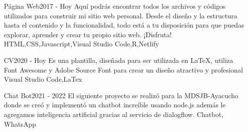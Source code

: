 %
%
%


\begin{projects}

	\project
	{Página Web}{2017 - Hoy}
	{ }
	{Aquí podrás encontrar todos los archivos y códigos utilizados para construir mi sitio web personal. Desde el diseño y la estructura hasta el contenido y la funcionalidad, todo está a tu disposición para que puedas explorar, aprender y crear tu propio sitio web. ¡Disfruta!}
	{HTML,CSS,Javascript,Visual Studio Code,R,Netlify}
	
	\project
	{CV}{2020 - Hoy}
	{ }
	{Es una plantilla, diseñada para ser utilizada en LaTeX, utiliza Font Awesome y Adobe Source Font para crear un diseño atractivo y profesional}
	{Visual Studio Code,LaTex}

	\project
	{Chat Bot}{2021 - 2022}
	{ }
	{El siguiente proyecto se realizó para la MDSJB-Ayacucho donde se creó y implementó un chatbot increíble usando node.js además le agregamos inteligencia artificial gracias al servicio de dialogflow.}
	{Chatbot, WhatsApp}

\end{projects}


